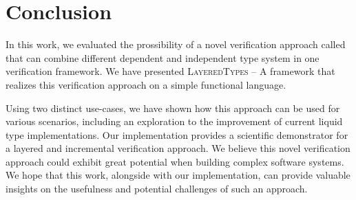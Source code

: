 \section{Conclusion}
\label{sec:conclusion}

In this work, we evaluated the prossibility of a novel verification approach called that can combine different dependent and independent type system in one verification framework. We have presented \textsc{LayeredTypes} -- A framework that realizes this verification approach on a simple functional language.

Using two distinct use-cases, we have shown how this approach can be used for various scenarios, including an exploration to the improvement of current liquid type implementations. Our implementation provides a scientific demonstrator for a layered and incremental verification approach. We believe this novel verification approach could exhibit great potential when building complex software systems. We hope that this work, alongside with our implementation, can provide valuable insights on the usefulness and potential challenges of such an approach.
